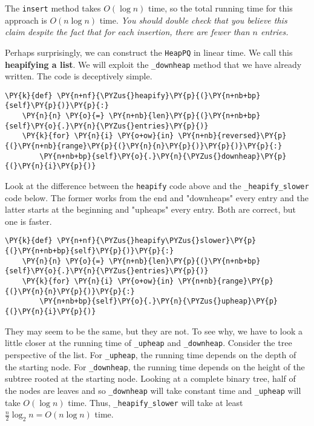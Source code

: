 The \texttt{insert} method takes $O(\log n)$ time, so the total running time for this approach is $O(n \log n)$ time.  \emph{You should double check that you believe this claim despite the fact that for each insertion, there are fewer than $n$ entries.}


Perhaps surprisingly, we can construct the \texttt{HeapPQ} in linear time.  We call this \textbf{heapifying a list}.  We will exploit the \texttt{\_downheap} method that we have already written.  The code is deceptively simple.

\begin{Verbatim}[commandchars=\\\{\}]
\PY{k}{def} \PY{n+nf}{\PYZus{}heapify}\PY{p}{(}\PY{n+nb+bp}{self}\PY{p}{)}\PY{p}{:}
    \PY{n}{n} \PY{o}{=} \PY{n+nb}{len}\PY{p}{(}\PY{n+nb+bp}{self}\PY{o}{.}\PY{n}{\PYZus{}entries}\PY{p}{)}
    \PY{k}{for} \PY{n}{i} \PY{o+ow}{in} \PY{n+nb}{reversed}\PY{p}{(}\PY{n+nb}{range}\PY{p}{(}\PY{n}{n}\PY{p}{)}\PY{p}{)}\PY{p}{:}
        \PY{n+nb+bp}{self}\PY{o}{.}\PY{n}{\PYZus{}downheap}\PY{p}{(}\PY{n}{i}\PY{p}{)}
\end{Verbatim}



Look at the difference between the \texttt{heapify} code above and the \texttt{\_heapify\_slower} code below.  The former works from the end and "downheaps" every entry and the latter starts at the beginning and "upheaps" every entry.  Both are correct, but one is faster.

\begin{Verbatim}[commandchars=\\\{\}]
\PY{k}{def} \PY{n+nf}{\PYZus{}heapify\PYZus{}slower}\PY{p}{(}\PY{n+nb+bp}{self}\PY{p}{)}\PY{p}{:}
    \PY{n}{n} \PY{o}{=} \PY{n+nb}{len}\PY{p}{(}\PY{n+nb+bp}{self}\PY{o}{.}\PY{n}{\PYZus{}entries}\PY{p}{)}
    \PY{k}{for} \PY{n}{i} \PY{o+ow}{in} \PY{n+nb}{range}\PY{p}{(}\PY{n}{n}\PY{p}{)}\PY{p}{:}
        \PY{n+nb+bp}{self}\PY{o}{.}\PY{n}{\PYZus{}upheap}\PY{p}{(}\PY{n}{i}\PY{p}{)}
\end{Verbatim}



They may seem to be the same, but they are not.  To see why, we have to look a little closer at the running time of \texttt{\_upheap} and \texttt{\_downheap}.  Consider the tree perspective of the list.  For \texttt{\_upheap}, the running time depends on the depth of the starting node.  For \texttt{\_downheap}, the running time depends on the height of the subtree rooted at the starting node.  Looking at a complete binary tree, half of the nodes are leaves and so \texttt{\_downheap} will take constant time and \texttt{\_upheap} will take $O(\log n)$ time.  Thus, \texttt{\_heapify\_slower} will take at least $\frac{n}{2}\log_2 n = O(n \log n)$ time.  


